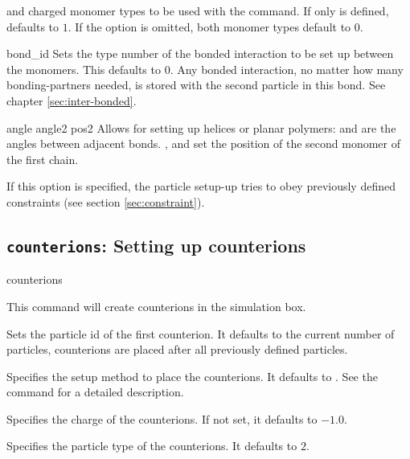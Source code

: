 \begin{arguments}
    and charged monomer types to be used with the 
    command. If only  is defined,
     defaults to $1$. If the option is
    omitted, both monomer types default to $0$.
  \item[\opt{bond \var{bondid}}] bond\_id Sets the type number of the bonded
    interaction to be set up between the monomers. This defaults to
    $0$.  Any bonded interaction, no matter how many bonding-partners
    needed, is stored with the second particle in this bond. See
    chapter \ref{sec:inter-bonded}.
  \item[\opt{angle \var{\phi} [\var{\theta} [\var{x} \var{y}
      \var{z}]]}] angle angle2 pos2 Allows for setting up helices or planar polymers:
    \var{\phi} and  are the angles between adjacent bonds.
    ,  and  set the position of the second
    monomer of the first chain.
  \item[\opt{constraints}] If this option is specified, the particle setup-up
  tries to obey previously defined constraints (see section \vref{sec:constraint}).
\end{arguments}

\subsection{\texttt{counterions}: Setting up counterions}
\begin{essyntax}
  counterions
  \begin{features}
  \end{features}
\end{essyntax}
This command will create  counterions in the simulation box.
\begin{arguments}
\item[\opt{start \var{pid}}] Sets the particle id of the first
  counterion.  It defaults to the current number of particles, \ie
  counterions are placed after all previously defined particles.
\item[\opt{mode \alt{SAW \asep RW} \opt{\var{shield}
      \opt{\var{try_\mathrm{max}} }}}] Specifies the setup method to
  place the counterions. It defaults to . See the
   command for a detailed description.
\item[\opt{charge \var{val}}] Specifies the charge of the counterions.
  If not set, it defaults to $-1.0$.
\item[\opt{type \var{typeid}}] Specifies the particle type of the
  counterions. It defaults to $2$.
\end{arguments}

